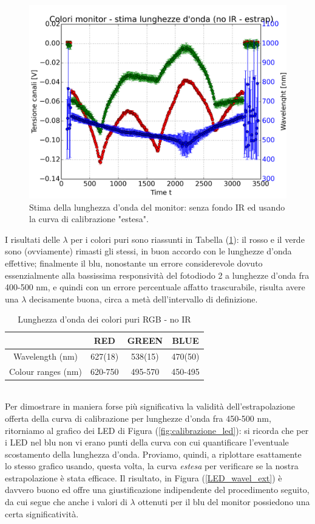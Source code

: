 \documentclass[10pt,letterpaper]{article}
\begin{document}
\begin{figure}
\centering
\includegraphics[width=0.7\linewidth]{./monitor_stima_lunghezzaonda_senzaIR_extended}
\caption{Stima della lunghezza d'onda del monitor: senza fondo IR ed usando la curva di calibrazione "estesa".}
\label{fig:monitor_stima_lunghezzaonda_senzaIR_extended}
\end{figure}

I risultati delle $\lambda$ per i colori puri sono riassunti in Tabella (\ref{RGB_lambda_noIR_ext}): il rosso e il verde sono (ovviamente) rimasti gli stessi, in buon accordo con le lunghezze d'onda effettive; finalmente il blu, nonostante un errore considerevole dovuto essenzialmente alla bassissima responsività del fotodiodo 2 a lunghezze d'onda fra 400-500 nm, e quindi con un errore percentuale affatto trascurabile, risulta avere una $\lambda$ decisamente buona, circa a metà dell'intervallo di definizione.\\

\begin{table}[h]
\centering
\begin{tabular}{c|c|c|c}
  & \textbf{RED} & \textbf{GREEN} & \textbf{BLUE} \\ 
 \hline Wavelength (nm) & 627(18) & 538(15) & 470(50) \\
 Colour ranges (nm) & 620-750 & 495-570 & 450-495 \\ 
\hline 
\end{tabular} 
\caption{Lunghezza d'onda dei colori puri RGB - no IR}
\label{RGB_lambda_noIR_ext}
\end{table}
~\\

Per dimostrare in maniera forse più significativa la validità dell'estrapolazione offerta della curva di calibrazione per lunghezze d'onda fra 450-500 nm, ritorniamo al grafico dei LED di Figura (\ref{fig:calibrazione_led}): si ricorda che per i LED nel blu non vi erano punti della curva con cui quantificare l'eventuale scostamento della lunghezza d'onda. Proviamo, quindi, a riplottare esattamente lo stesso grafico usando, questa volta, la curva \textit{estesa} per verificare se la nostra estrapolazione è stata efficace. Il risultato, in Figura (\ref{LED_wavel_ext}) è davvero buono ed offre una giustificazione indipendente del procedimento seguito, da cui segue che anche i valori di $\lambda$ ottenuti per il blu del monitor possiedono una certa significatività.
\end{document}
